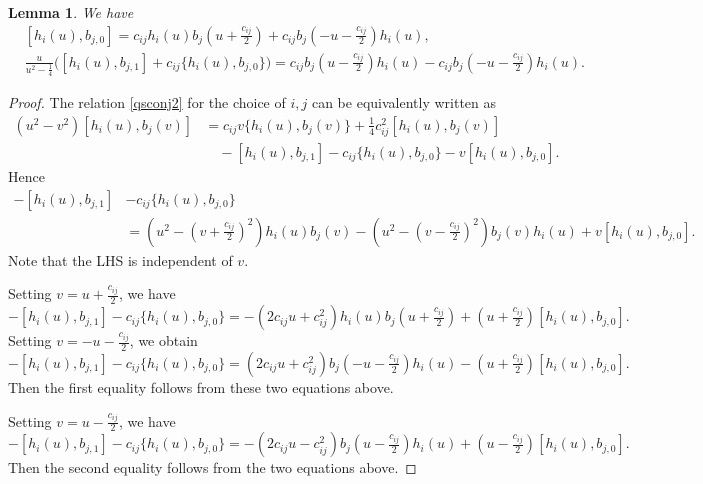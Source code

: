 \documentclass[11pt,reqno]{amsart}
\numberwithin{equation}{section}
\newtheorem{lem}[thm]{Lemma}
\theoremstyle{definition}
\theoremstyle{remark}
\begin{document}
\begin{lem}
We have
\begin{align}
&[ h_i(u), b_{j,0}]= c_{ij} h_i(u) b_j(u+\tfrac{c_{ij}}{2})+c_{ij} b_j(-u-\tfrac{c_{ij}}{2}) h_i(u),\label{hb1}\\
&\frac{u}{u^2-\frac{1}4}\big([ h_i(u), b_{j,1}]+c_{ij} \{ h_i(u), b_{j,0}\}\big)= c_{ij}b_j(u-\tfrac{c_{ij}}{2}) h_i(u)-c_{ij}b_j(-u-\tfrac{c_{ij}}{2}) h_i(u).\label{hb2}
\end{align}
\end{lem}
\begin{proof}
The relation \eqref{qsconj2} for the choice of $i,j$ can be equivalently written as
\begin{align*}
(u^2-v^2)[ h_i(u),b_j(v)]&=c_{ij}v\{ h_i(u), b_j(v)\}+\frac{1}{4}c_{ij}^2[h_i(u),b_j(v)]\\&\quad -[ h_i(u), b_{j,1}]-c_{ij}\{ h_i(u), b_{j,0}\}-v[ h_i(u), b_{j,0}].
\end{align*}
Hence
\begin{align*}
-[ h_i(u), b_{j,1}]&-c_{ij} \{ h_i(u), b_{j,0}\}\\&=(u^2-(v+\tfrac{c_{ij}}{2})^2) h_i(u) b_j(v)-(u^2-(v-\tfrac{c_{ij}}{2})^2) b_j(v) h_i(u)	+v[ h_i(u), b_{j,0}].
\end{align*}
Note that the LHS is independent of $v$.

Setting $v=u+\tfrac{c_{ij}}{2}$, we have
\[
-[ h_i(u), b_{j,1}]-c_{ij}\{ h_i(u), b_{j,0}\}=-(2c_{ij}u+c_{ij}^2) h_i(u) b_j(u+\tfrac{c_{ij}}{2})+(u+\tfrac{c_{ij}}{2})[ h_i(u), b_{j,0}].
\]	
Setting $v=-u-\tfrac{c_{ij}}{2}$, we obtain
\[
-[ h_i(u), b_{j,1}]-c_{ij} \{ h_i(u), b_{j,0}\}=(2c_{ij}u+c_{ij}^2) b_j(-u-\tfrac{c_{ij}}{2}) h_i(u)-(u+\tfrac{c_{ij}}{2})[ h_i(u), b_{j,0}].
\]
Then the first equality follows from these two equations above.

Setting $v=u-\tfrac{c_{ij}}{2}$, we have
\[
-[ h_i(u), b_{j,1}]-c_{ij} \{ h_i(u), b_{j,0}\}=-(2c_{ij}u-c_{ij}^2) b_j(u-\tfrac{c_{ij}}{2}) h_i(u)+(u-\tfrac{c_{ij}}{2})[ h_i(u), b_{j,0}].
\]	
Then the second equality follows from the two equations above.
\end{proof}
\end{document}
